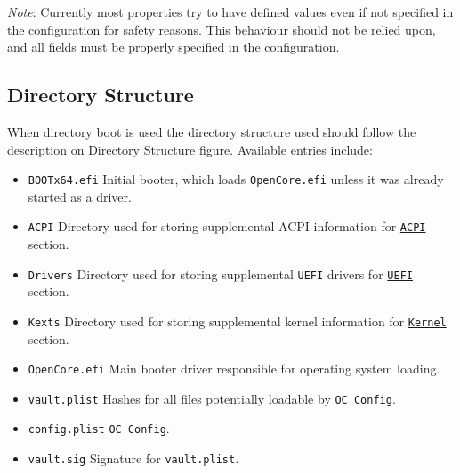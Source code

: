 \documentclass[]{article}
\providecommand{\tightlist}{%
  \setlength{\itemsep}{0pt}\setlength{\parskip}{0pt}}
\begin{document}
\emph{Note}: Currently most properties try to have defined values even if not
specified in the configuration for safety reasons. This behaviour should not
be relied upon, and all fields must be properly specified in the configuration.

\subsection{Directory Structure}\label{directory-structure}

When directory boot is used the directory structure used should follow
the description on \hyperref[fig:DS]{Directory Structure} figure. Available
entries include:

\begin{itemize}
\tightlist
\item
  \texttt{BOOTx64.efi}
  \break
  Initial booter, which loads \texttt{OpenCore.efi} unless it was
  already started as a driver.
\item
  \texttt{ACPI}
  \break
  Directory used for storing supplemental ACPI information
  for \hyperref[acpi]{\texttt{ACPI}} section.
\item
  \texttt{Drivers}
  \break
  Directory used for storing supplemental \texttt{UEFI}
  drivers for \hyperref[uefi]{\texttt{UEFI}} section.
\item
  \texttt{Kexts}
  \break
  Directory used for storing supplemental kernel information
  for \hyperref[kernel]{\texttt{Kernel}} section.
\item
  \texttt{OpenCore.efi}
  \break
  Main booter driver responsible for operating system loading.
\item
  \texttt{vault.plist}
  \break
  Hashes for all files potentially loadable by \texttt{OC Config}.
\item
  \texttt{config.plist}
  \break
  \texttt{OC Config}.
\item
  \texttt{vault.sig}
  \break
  Signature for \texttt{vault.plist}.
\end{itemize}
\end{document}
